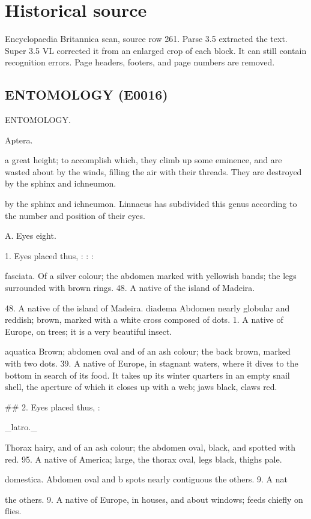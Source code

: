 \documentclass{article}
\begin{document}
\section*{Historical source}
Encyclopaedia Britannica scan, source row 261. Parse 3.5 extracted the text. Super 3.5 VL corrected it from an enlarged crop of each block. It can still contain recognition errors.
Page headers, footers, and page numbers are removed.

\subsection*{ENTOMOLOGY (E0016)}
ENTOMOLOGY.

Aptera.

a great height; to accomplish which, they climb up some eminence, and are wasted about by the winds, filling the air with their threads. They are destroyed by the sphinx and ichneumon.

by the sphinx and ichneumon.
Linnaeus has subdivided this genus according to the
number and position of their eyes.

A. Eyes eight.

1. Eyes placed thus, : : :

fasciata. Of a silver colour; the abdomen marked with yellowish bands; the legs surrounded with brown rings. 48. A native of the island of Madeira.

48. A native of the island of Madeira.
diadema Abdomen nearly globular and reddish; brown, marked with a white cross composed of dots. 1. A native of Europe, on trees; it is a very beautiful insect.

aquatica Brown; abdomen oval and of an ash colour; the back brown, marked with two dots. 39. A native of Europe, in stagnant waters, where it dives to the bottom in search of its food. It takes up its winter quarters in an empty snail shell, the aperture of which it closes up with a web; jaws black, claws red.

\#\# 2. Eyes placed thus, :

\_latro.\_

Thorax hairy, and of an ash colour; the abdomen oval, black, and spotted with red. 95. A native of America; large, the thorax oval, legs black, thighs pale.

domestica. Abdomen oval and b
spots nearly contiguous
the others. 9. A nat

the others. 9. A native of Europe, in houses, and about windows; feeds chiefly on flies.
\end{document}
